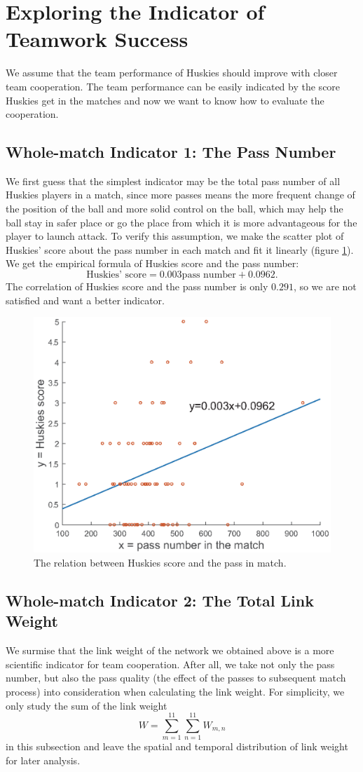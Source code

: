 \documentclass[12pt]{article}
\begin{document}
\section{Exploring the Indicator of Teamwork Success}
We assume that the team performance of Huskies should improve with closer team cooperation. The team performance can be easily indicated by the score Huskies get in the matches and now we want to know how to evaluate the cooperation.

\subsection{Whole-match Indicator 1: The Pass Number}
We first guess that the simplest indicator may be the total pass number of all Huskies players in a match, since more passes means the more frequent change of the position of the ball and more solid control on the ball, which may help the ball stay in safer place or go the place from which it is more advantageous for the player to launch attack. To verify this assumption, we make the scatter plot of Huskies' score about the pass number in each match and fit it linearly (figure \ref{score-pass}). We get the empirical formula of Huskies score and the pass number:
\begin{equation}
	\text{Huskies' score}=0.003\text{pass number}+0.0962.
\end{equation}
The correlation of Huskies score and the pass number is only $0.291$, so we are not satisfied and want a better indicator.
\begin{figure}[h]
	\centering
	\includegraphics[width=.6\textwidth]{score-pass.eps}
	\caption{The relation between Huskies score and the pass in match.}
	\label{score-pass}
\end{figure}

\subsection{Whole-match Indicator 2: The Total Link Weight}
We surmise that the link weight of the network we obtained above is a more scientific indicator for team cooperation. After all, we take not only the pass number, but also the pass quality (the effect of the passes to subsequent match process) into consideration when calculating the link weight. For simplicity, we only study the sum of the link weight
\begin{equation}
	W=\sum_{m=1}^{11}\sum_{n=1}^{11}W_{m,n}
\end{equation}
in this subsection and leave the spatial and temporal distribution of link weight for later analysis.
\end{document}
